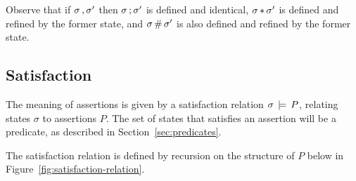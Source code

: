 \documentclass[11pt]{report}
\begin{document}
Observe that if $\sigma \operatorname{,} \sigma'$ then $\sigma \operatorname{;} \sigma'$ is defined and identical, $\sigma \operatorname{\ast} \sigma'$ is defined and refined by the former state, and $\sigma \operatorname{\#} \sigma'$ is also defined and refined by the former state.

\subsection{Satisfaction}

The meaning of assertions is given by a satisfaction relation $\sigma \,\models\, P$, relating states $\sigma$ to assertions $P$. The set of states that satisfies an assertion will be a predicate, as described in Section~\ref{sec:predicates}. 

The satisfaction relation is defined by recursion on the structure of $P$ below in Figure~\ref{fig:satisfaction-relation}. 
\end{document}
